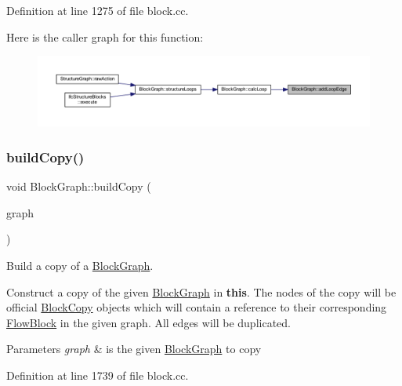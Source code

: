 Definition at line 1275 of file block.\+cc.

Here is the caller graph for this function\+:
\nopagebreak
\begin{figure}[H]
\begin{center}
\leavevmode
\includegraphics[width=350pt]{class_block_graph_af4f0c927ad7c32721de2474b6180cb48_icgraph}
\end{center}
\end{figure}
\mbox{\label{class_block_graph_a85422522e8c61496c5253f410f140fcc}} 
\subsubsection{\texorpdfstring{buildCopy()}{buildCopy()}}
{\footnotesize\ttfamily void Block\+Graph\+::build\+Copy (\begin{DoxyParamCaption}\item[{const \mbox{\hyperlink{class_block_graph}{Block\+Graph}} \&}]{graph }\end{DoxyParamCaption})}



Build a copy of a \mbox{\hyperlink{class_block_graph}{Block\+Graph}}. 

Construct a copy of the given \mbox{\hyperlink{class_block_graph}{Block\+Graph}} in {\bfseries{this}}. The nodes of the copy will be official \mbox{\hyperlink{class_block_copy}{Block\+Copy}} objects which will contain a reference to their corresponding \mbox{\hyperlink{class_flow_block}{Flow\+Block}} in the given graph. All edges will be duplicated. 
\begin{DoxyParams}{Parameters}
{\em graph} & is the given \mbox{\hyperlink{class_block_graph}{Block\+Graph}} to copy \\
\hline
\end{DoxyParams}


Definition at line 1739 of file block.\+cc.

